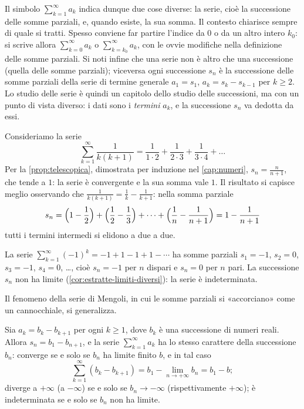 Il simbolo $\sum_{k=1}^{\infty}a_{k}$ indica dunque due cose diverse: la serie, cioè la
successione delle somme parziali, e, quando esiste, la sua somma. Il contesto chiarisce
sempre di quale si tratti. Spesso conviene far partire l'indice da $0$ o da un altro
intero $k_{0}$: si scrive allora $\sum_{k=0}^{\infty}a_{k}$ o $\sum_{k=k_{0}}^{\infty}a_{k}$, con
le ovvie modifiche nella definizione delle somme parziali. Si noti infine che una serie
non è altro che una successione (quella delle somme parziali); viceversa ogni successione
$s_{n}$ è la successione delle somme parziali della serie di termine generale $a_{1}=s_{1}$,
$a_{k}=s_{k}-s_{k-1}$ per $k\ge2$. Lo studio delle serie è quindi un capitolo dello studio
delle successioni, ma con un punto di vista diverso: i dati sono i \emph{termini} $a_{k}$, e
la successione $s_{n}$ va dedotta da essi.

\begin{esempio}\label{es:mengoli}
Consideriamo la serie
\begin{equation}\label{eq:mengoli}
  \sum_{k=1}^{\infty}\frac1{k(k+1)}=\frac1{1\cdot2}+\frac1{2\cdot3}+\frac1{3\cdot4}+\dots
\end{equation}
Per la \cref{prop:telescopica}, dimostrata per induzione nel \cref{cap:numeri},
$s_{n}=\frac n{n+1}$, che tende a $1$: la serie è convergente e la sua somma vale $1$. Il
risultato si capisce meglio osservando che $\frac1{k(k+1)}=\frac1k-\frac1{k+1}$: nella somma
parziale
\[
  s_{n}=\Bigl(1-\frac12\Bigr)+\Bigl(\frac12-\frac13\Bigr)+\dots+\Bigl(\frac1n-\frac1{n+1}\Bigr)=1-\frac1{n+1}
\]
tutti i termini intermedi si elidono a due a due.
\end{esempio}

\begin{esempio}\label{es:serie-indeterminata}
La serie $\sum_{k=1}^{\infty}(-1)^{k}=-1+1-1+1-\cdots$ ha somme parziali $s_{1}=-1$, $s_{2}=0$,
$s_{3}=-1$, $s_{4}=0$, \dots, cioè $s_{n}=-1$ per $n$ dispari e $s_{n}=0$ per $n$ pari. La
successione $s_{n}$ non ha limite (\cref{cor:estratte-limiti-diversi}): la serie è
indeterminata.
\end{esempio}

Il fenomeno della serie di Mengoli, in cui le somme parziali si «accorciano» come un
cannocchiale, si generalizza.

\begin{proposizione}\label{prop:serie-telescopica}
Sia $a_{k}=b_{k}-b_{k+1}$ per ogni $k\ge1$, dove $b_{k}$ è una successione di numeri reali.
Allora $s_{n}=b_{1}-b_{n+1}$, e la serie $\sum_{k=1}^{\infty}a_{k}$ ha lo stesso carattere della
successione $b_{n}$: converge se e solo se $b_{n}$ ha limite finito $b$, e in tal caso
\begin{equation}\label{eq:serie-telescopica}
  \sum_{k=1}^{\infty}(b_{k}-b_{k+1})=b_{1}-\lim_{n\to+\infty}b_{n}=b_{1}-b ;
\end{equation}
diverge a $+\infty$ (a $-\infty$) se e solo se $b_{n}\to-\infty$ (rispettivamente $+\infty$);
è indeterminata se e solo se $b_{n}$ non ha limite.
\end{proposizione}

